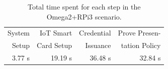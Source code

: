 \begin{table}[!ht]
	\centering
	\begin{tabular}{|r|r|r|r|}
		\hline
		System & IoT Smart  & Credential  & Prove Presen-\\
		Setup & Card Setup & Issuance & tation Policy\\ \hline
		3.77 s & 19.19 s & 36.48 s & 32.84 s \\ \hline
	\end{tabular}
	\caption{Total time spent for each step in the Omega2+RPi3 scenario.}
	\label{totaltime}
\end{table}



